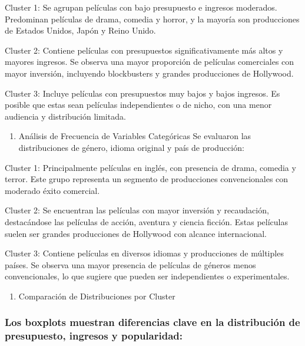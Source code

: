 \documentclass[
]{article}
\providecommand{\tightlist}{%
  \setlength{\itemsep}{0pt}\setlength{\parskip}{0pt}}
\begin{document}
Cluster 1: Se agrupan películas con bajo presupuesto e ingresos
moderados. Predominan películas de drama, comedia y horror, y la mayoría
son producciones de Estados Unidos, Japón y Reino Unido.

Cluster 2: Contiene películas con presupuestos significativamente más
altos y mayores ingresos. Se observa una mayor proporción de películas
comerciales con mayor inversión, incluyendo blockbusters y grandes
producciones de Hollywood.

Cluster 3: Incluye películas con presupuestos muy bajos y bajos
ingresos. Es posible que estas sean películas independientes o de nicho,
con una menor audiencia y distribución limitada.

\begin{enumerate}
\def\labelenumi{\arabic{enumi}.}
\setcounter{enumi}{1}
\tightlist
\item
  Análisis de Frecuencia de Variables Categóricas Se evaluaron las
  distribuciones de género, idioma original y país de producción:
\end{enumerate}

Cluster 1: Principalmente películas en inglés, con presencia de drama,
comedia y terror. Este grupo representa un segmento de producciones
convencionales con moderado éxito comercial.

Cluster 2: Se encuentran las películas con mayor inversión y
recaudación, destacándose las películas de acción, aventura y ciencia
ficción. Estas películas suelen ser grandes producciones de Hollywood
con alcance internacional.

Cluster 3: Contiene películas en diversos idiomas y producciones de
múltiples países. Se observa una mayor presencia de películas de géneros
menos convencionales, lo que sugiere que pueden ser independientes o
experimentales.

\begin{enumerate}
\def\labelenumi{\arabic{enumi}.}
\setcounter{enumi}{2}
\tightlist
\item
  Comparación de Distribuciones por Cluster
\end{enumerate}

\subsubsection{Los boxplots muestran diferencias clave en la
distribución de presupuesto, ingresos y
popularidad:}\label{los-boxplots-muestran-diferencias-clave-en-la-distribuciuxf3n-de-presupuesto-ingresos-y-popularidad}
\end{document}
